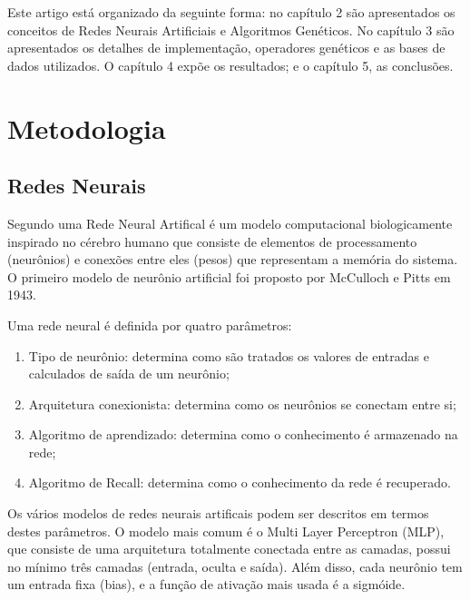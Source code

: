\documentclass[12pt]{article}
\begin{document}
\par Este artigo está organizado da seguinte forma: no capítulo 2 são apresentados os conceitos de Redes Neurais Artificiais e Algoritmos Genéticos. No capítulo 3 são apresentados os detalhes de implementação, operadores genéticos e as bases de dados utilizados. O capítulo 4 expõe os resultados; e o capítulo 5, as conclusões.

\section{Metodologia} \label{sec:metodologia}

\subsection{Redes Neurais}

\par Segundo \cite{kasabov} uma Rede Neural Artifical é um modelo computacional biologicamente inspirado no cérebro humano que consiste de elementos de processamento (neurônios) e conexões entre eles (pesos) que representam a memória do sistema. O primeiro modelo de neurônio artificial foi proposto por McCulloch e Pitts em 1943. 
\par Uma rede neural é definida por quatro parâmetros:

\begin{enumerate}
	\item Tipo de neurônio: determina como são tratados os valores de entradas e calculados de saída de um neurônio;
	\item Arquitetura conexionista: determina como os neurônios se conectam entre si;
	\item Algoritmo de aprendizado: determina como o conhecimento é armazenado na rede;
	\item Algoritmo de Recall: determina como o conhecimento da rede é recuperado.
\end{enumerate}

\par Os vários modelos de redes neurais artificais podem ser descritos em termos destes parâmetros. O modelo mais comum é o Multi Layer Perceptron (MLP), que consiste de uma arquitetura totalmente conectada entre as camadas, possui no mínimo três camadas (entrada, oculta e saída). Além disso, cada neurônio tem um entrada fixa (bias), e a função de ativação mais usada é a sigmóide.
\end{document}
